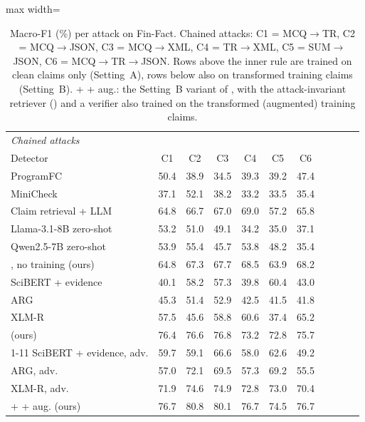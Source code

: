 \begin{table}[t]
\begin{adjustbox}{max width=\textwidth}
\begin{tabular}{lcccccccccc}
\multicolumn{11}{l}{\emph{Chained attacks}} \\
Detector & C1 & C2 & C3 & C4 & C5 & C6 &  &  &  &  \\
\midrule
ProgramFC \citep{pan2023programfc} & 50.4 & 38.9 & 34.5 & 39.3 & 39.2 & 47.4 &  &  &  &  \\
MiniCheck \citep{tang2024minicheck} & 37.1 & 52.1 & 38.2 & 33.2 & 33.5 & 35.4 &  &  &  &  \\
Claim retrieval + LLM \citep{pikuliak2023multiclaim} & 64.8 & 66.7 & 67.0 & 69.0 & 57.2 & 65.8 &  &  &  &  \\
Llama-3.1-8B zero-shot \citep{grattafiori2024llama3} & 53.2 & 51.0 & 49.1 & 34.2 & 35.0 & 37.1 &  &  &  &  \\
Qwen2.5-7B zero-shot \citep{qwen2024qwen25} & 53.9 & 55.4 & 45.7 & 53.8 & 48.2 & 35.4 &  &  &  &  \\
\method{}, no training (ours) & 64.8 & 67.3 & 67.7 & 68.5 & 63.9 & 68.2 &  &  &  &  \\
SciBERT + evidence \citep{kotonya2020pubhealth} & 40.1 & 58.2 & 57.3 & 39.8 & 60.4 & 43.0 &  &  &  &  \\
ARG \citep{hu2024arg} & 45.3 & 51.4 & 52.9 & 42.5 & 41.5 & 41.8 &  &  &  &  \\
XLM-R \citep{conneau2020xlmr} & 57.5 & 45.6 & 58.8 & 60.6 & 37.4 & 65.2 &  &  &  &  \\
\method{} (ours) & 76.4 & 76.6 & 76.8 & 73.2 & 72.8 & 75.7 &  &  &  &  \\
\cmidrule(lr){1-11}
SciBERT + evidence, adv. \citep{kotonya2020pubhealth} & 59.7 & 59.1 & 66.6 & 58.0 & 62.6 & 49.2 &  &  &  &  \\
ARG, adv. \citep{hu2024arg} & 57.0 & 72.1 & 69.5 & 57.3 & 69.2 & 55.5 &  &  &  &  \\
XLM-R, adv. \citep{conneau2020xlmr} & 71.9 & 74.6 & 74.9 & 72.8 & 73.0 & 70.4 &  &  &  &  \\
\method{} + \air{} + aug. (ours) & 76.7 & 80.8 & 80.1 & 76.7 & 74.5 & 76.7 &  &  &  &  \\
\bottomrule
\end{tabular}\end{adjustbox}
\caption{Macro-F1 (\%) per attack on Fin-Fact. Chained attacks: C1 = MCQ$\to$TR, C2 = MCQ$\to$JSON, C3 = MCQ$\to$XML, C4 = TR$\to$XML, C5 = SUM$\to$JSON, C6 = MCQ$\to$TR$\to$JSON. Rows above the inner rule are trained on clean claims only (Setting~A), rows below also on transformed training claims (Setting~B). \method{} + \air{} + aug.: the Setting~B variant of \method{}, with the attack-invariant retriever (\air{}) and a verifier also trained on the transformed (augmented) training claims.}
\label{tab:per_finfact}
\end{table}
